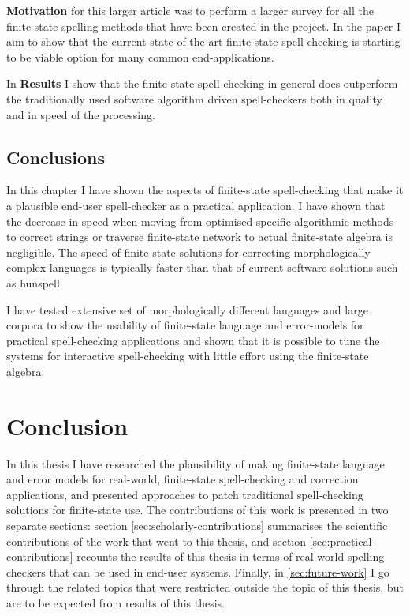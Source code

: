 \documentclass[officiallayout]{unihelcompling}
\begin{document}
\textbf{Motivation} for this larger article was to perform a larger survey
for all the finite-state spelling methods that have been created in the
project. In the paper I aim to show that the current state-of-the-art
finite-state spell-checking is starting to be viable option for many
common end-applications.

In \textbf{Results} I show that the finite-state spell-checking in general
does outperform the traditionally used software algorithm driven spell-checkers
both in quality and in speed of the processing.

\section{Conclusions}

In this chapter I have shown the aspects of finite-state spell-checking that
make it a plausible end-user spell-checker as a practical application. I have
shown that the decrease in speed when moving from optimised specific
algorithmic methods to correct strings or traverse finite-state network to
actual finite-state algebra is negligible. The speed of finite-state solutions
for correcting morphologically complex languages is typically faster than
that of current software solutions such as hunspell.

I have tested extensive set of morphologically different languages and
large corpora to show the usability of finite-state language and error-models
for practical spell-checking applications and shown that it is possible to tune
the systems for interactive spell-checking with little effort using the
finite-state algebra.

\chapter{Conclusion}
\label{chap:conclusion}

In this thesis I have researched the plausibility of making finite-state
language and error models for real-world, finite-state spell-checking and
correction applications, and presented approaches to patch traditional
spell-checking solutions for finite-state use. The contributions of this work
is presented in two separate sections: section
\ref{sec:scholarly-contributions} summarises the scientific contributions of
the work that went to this thesis, and section
\ref{sec:practical-contributions} recounts the results of this thesis in terms
of real-world spelling checkers that can be used in end-user systems. Finally,
in \ref{sec:future-work} I go through the related topics that were restricted
outside the topic of this thesis, but are to be expected from results of this
thesis.
\end{document}
